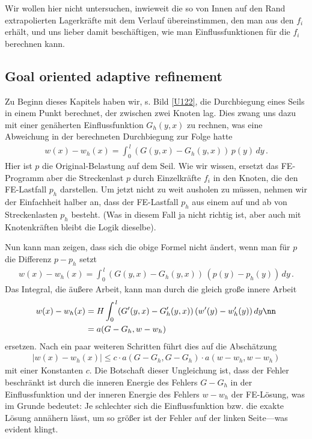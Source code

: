 {Wir wollen hier nicht untersuchen, inwieweit die so von Innen auf den Rand extrapolierten Lagerkr\"{a}fte mit dem Verlauf \"{u}bereinstimmen, den man aus den $f_i$ erh\"{a}lt, und uns lieber damit besch\"{a}ftigen, wie man Einflussfunktionen f\"{u}r die $f_i$ berechnen kann.\\

{\textcolor{blau2}{\section{Goal oriented adaptive refinement}}
Zu Beginn dieses Kapitels haben wir, s. Bild \ref{U122}, die Durchbiegung eines Seils in einem Punkt berechnet, der zwischen zwei Knoten lag. Dies zwang uns dazu mit einer gen\"{a}herten Einflussfunktion $G_h(y,x)$ zu rechnen, was eine Abweichung in der berechneten Durchbiegung zur Folge hatte
\begin{align}
w(x) - w_h(x) = \int_0^{\,l} (G(y,x) - G_h(y,x))\,p(y)\,dy\,.
\end{align}
Hier ist $p$ die Original-Belastung auf dem Seil. Wie wir wissen, ersetzt das FE-Programm aber die Streckenlast $p$ durch Einzelkr\"{a}fte $f_i$ in den Knoten, die den FE-Lastfall $p_h$ darstellen. Um jetzt nicht zu weit ausholen zu m\"{u}ssen, nehmen wir der Einfachheit halber an, dass der FE-Lastfall $p_h$  aus einem auf und ab von Streckenlasten $p_h$ besteht. (Was in diesem Fall ja nicht richtig ist, aber auch mit Knotenkr\"{a}ften bleibt die Logik dieselbe).

Nun kann man zeigen, dass sich die obige Formel nicht \"{a}ndert, wenn man f\"{u}r $p$ die Differenz $p - p_h$ setzt
\begin{align} \label{Eq85}
w(x) - w_h(x) = \int_0^{\,l} (G(y,x) - G_h(y,x))\,(p(y) - p_h(y))\,dy\,.
\end{align}
Das Integral, die \"{a}u{\ss}ere Arbeit, kann man durch die gleich gro{\ss}e innere  Arbeit
\begin{align} \label{Eq86}
w(x) - w_h(x) &= H \int_0^{\,l} (G'(y,x) - G_h'(y,x))\,(w'(y) - w_h'(y))\,dy\nn \\
 &= a(G-G_h,w-w_h)
\end{align}
ersetzen. Nach ein paar weiteren Schritten f\"{u}hrt dies auf die Absch\"{a}tzung
\begin{align}
|w(x) - w_h(x)| \leq c \cdot a(G-G_h,G-G_h)\cdot a(w-w_h,w-w_h)
\end{align}
mit einer Konstanten $c$. Die Botschaft dieser Ungleichung ist, dass der Fehler beschr\"{a}nkt ist durch die inneren Energie des Fehlers $G-G_h$ in der Einflussfunktion und der inneren Energie des Fehlers $w - w_h$ der FE-L\"{o}sung, was im Grunde bedeutet: Je schlechter sich die Einflussfunktion bzw. die exakte L\"{o}sung ann\"{a}hern l\"{a}sst, um so gr\"{o}{\ss}er ist der Fehler auf der linken Seite---was evident klingt.
\\

}}

